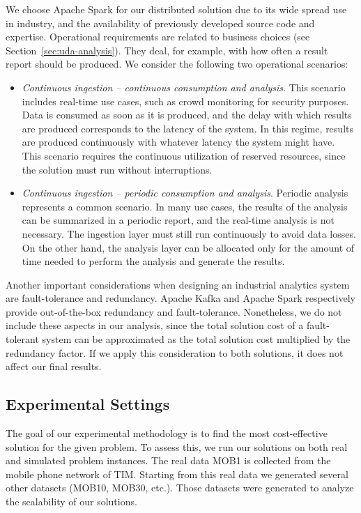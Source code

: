 {We choose Apache Spark for our distributed solution due to its wide spread use in industry, and the availability of previously developed source code and expertise.
Operational requirements are related to business choices (see Section~\ref{sec:uda-analysis}). They deal, for example, with how often a result report should be produced. We consider the following two operational scenarios:
\begin{itemize}
\item \textit{Continuous ingestion -- continuous consumption and analysis}. This scenario includes real-time use cases, such as crowd monitoring for security purposes. Data is consumed as soon as it is produced, and the delay with which results are produced corresponds to the latency of the system. In this regime, results are produced continuously with whatever latency the system might have. This scenario requires the continuous utilization of reserved resources, since the solution must run without interruptions.
\item \textit{Continuous ingestion -- periodic consumption and analysis}. Periodic analysis represents a common scenario. In many use cases, the results of the analysis can be summarized in a periodic report, and the real-time analysis is not necessary. The ingestion layer must still run continuously to avoid data losses. On the other hand, the analysis layer can be allocated only for the amount of time needed to perform the analysis and generate the results.
\end{itemize}

Another important considerations when designing an industrial analytics system are fault-tolerance and redundancy. Apache Kafka and Apache Spark respectively provide out-of-the-box redundancy and fault-tolerance. Nonetheless, we do not include these aspects in our analysis, since the total solution cost of a fault-tolerant system can be approximated as the total solution cost multiplied by the redundancy factor. If we apply this consideration to both solutions, it does not affect our final results.

\subsection{Experimental Settings}
The goal of our experimental methodology is to find the most cost-effective solution for the given problem. To assess this, we run our solutions on both real and simulated problem instances. The real data MOB1 is collected from the mobile phone network of TIM. Starting from this real data we generated several other datasets (MOB10, MOB30, etc.). Those datasets were generated to analyze the scalability of our solutions. 

}
